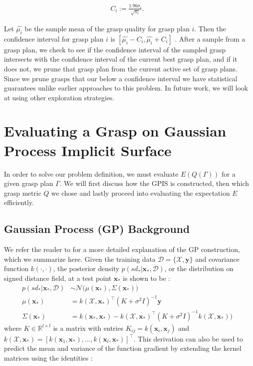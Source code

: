 \documentclass[letterpaper, 10 pt, conference]{ieeeconf}  %
\newcommand{\by}{\mathbf{y}}
\newcommand{\bx}{\mathbf{x}}
\newcommand{\mX}{\mathcal{X}}
\newcommand{\mD}{\mathcal{D}}
\newcommand{\mN}{\mathcal{N}}
\begin{document}
\vspace{-2ex}
\begin{align}
C_{ i} := \frac{1.96 \sigma_i}{\sqrt{n_i}}.
\end{align}

Let $\hat{\mu_i}$ be the sample mean of the grasp quality for grasp plan $i$.
Then the confidence interval for grasp plan $i$ is $[\hat{\mu_i} - C_i, \hat{\mu_i} + C_i]$ \cite{caflisch1998monte}.  
After a sample from a grasp plan, we check to see if the confidence interval of the sampled grasp intersects with the confidence interval of the current best grasp plan, and if it does not, we prune that grasp plan from the current active set of  grasp plans. Since we prune grasps that our below a confidence interval we have statistical guarantees unlike earlier approaches to this problem\cite{kehoe2012toward}. In future work, we will look at using other exploration strategies. 

\section{Evaluating a Grasp on Gaussian Process Implicit Surface}
 In order to solve our problem definition, we must evaluate $E(Q(\Gamma))$ for a given grasp plan $\Gamma$. We will first discuss how the GPIS is constructed, then which grasp metric $Q$ we chose and lastly proceed into evaluating the expectation $E$ efficiently. 


\subsection{Gaussian Process (GP) Background}\label{sec:GP}
We refer the reader to \cite{mahler2015opt} for a more detailed explanation of the GP construction, which we summarize here.  Given the training data $\mD = \{\mX, \by\}$ and covariance function $k(\cdot,\cdot)$, the posterior density $p(sd_*|\bx_*,\mD)$, or the distribution on signed distance field, at a test point $\bx_{*}$ is shown to be \cite{rasmussen2010gaussian}:
\begin{align*}
	p(sd_*|\bx_*,\mD) &\sim \mN\big(\mu(\bx_*), \Sigma(\bx_*)\big) \\
	\mu(\bx_*) &= k(\mX,\bx_*)^{\intercal}(K + \sigma^2I)^{-1}\by \\
	\Sigma(\bx_*) &= k(\bx_*,\bx_*)-k(\mX,\bx_*)^{\intercal}(K+\sigma^2I)^{-1}k(\mX,\bx_*)\big) 
\end{align*}
where $K \in \mathbb{R}^{l \times l}$ is a matrix with entries $K_{ij} = k(\bx_i,\bx_j)$ and $k(\mX,\bx_*) = [k(\bx_1,\bx_*),\ldots,k(\bx_l,\bx_*)]^{\intercal}$. 
This derivation can also be used to predict the mean and variance of the function gradient by extending the kernel matrices using the identities \cite{solak2003derivative}:
\end{document}
